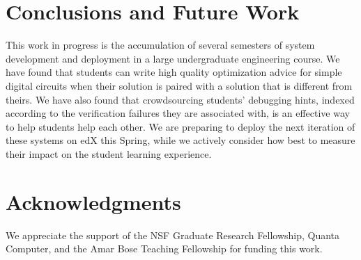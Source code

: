 \documentclass{sigchi}
\begin{document}
\section{Conclusions and Future Work}

This work in progress is the accumulation of several semesters of system development and deployment in a large undergraduate engineering course. We have found that students can write high quality optimization advice for simple digital circuits when their solution is paired with a solution that is different from theirs. We have also found that crowdsourcing students' debugging hints, indexed according to the verification failures they are associated with, is an effective way to help students help each other. We are preparing to deploy the next iteration of these systems on edX this Spring, while we actively consider how best to measure their impact on the student learning experience.

\section{Acknowledgments}

We appreciate the support of the NSF Graduate Research Fellowship, Quanta Computer, and the Amar Bose Teaching Fellowship for funding this work.

%
%
%
%
%
\balance





\end{document}
